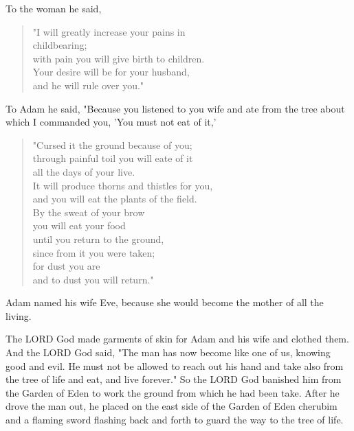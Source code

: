 \V To the woman he said,

\begin{quotation}
"I will greatly increase your pains in\\
childbearing;\\
with pain you will give birth to children.\\
Your desire will be for your husband,\\
and he will rule over you."
\end{quotation}

\V To Adam he said, "Because you listened to you wife and ate from the tree
about which I commanded you, 'You must not eat of it,'

\begin{quotation}
"Cursed it the ground because of you;\\
through painful toil you will eate of it\\
all the days of your live.\\
\V It will produce thorns and thistles for you,\\
and you will eat the plants of the field.\\
\V By the sweat of your brow\\
you will eat your food\\
until you return to the ground,\\
since from it you were taken;\\
for dust you are\\
and to dust you will return."
\end{quotation}

\V Adam named his wife Eve, because she would become the mother of all the
living.

\V The LORD God made garments of skin for Adam and his wife and clothed them. \V
And the LORD God said, "The man has now become like one of us, knowing good and
evil. He must not be allowed to reach out his hand and take also from the tree
of life and eat, and live forever." \V So the LORD God banished him from the
Garden of Eden to work the ground from which he had been take. \V After he drove
the man out, he placed on the east side of the Garden of Eden cherubim and a
flaming sword flashing back and forth to guard the way to the tree of life.
